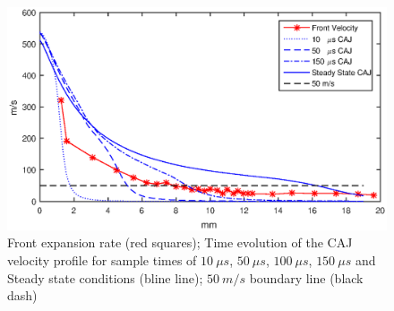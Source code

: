 \documentclass[a4paper]{iacas}%
\begin{document}
\begin{figure}
	\includegraphics[width=\textwidth]{Vel_Times.eps}
	\caption{Front expansion rate (red squares); Time evolution of the CAJ velocity profile for sample times of $10~\mu s$, $50~\mu s$, $100~\mu s$, $150~\mu s$ and Steady state conditions (bline line); $50~m/s$ boundary line (black dash) }
	\label{fig:model_caj_velocity}
\end{figure}

\clearpage


\end{document}
